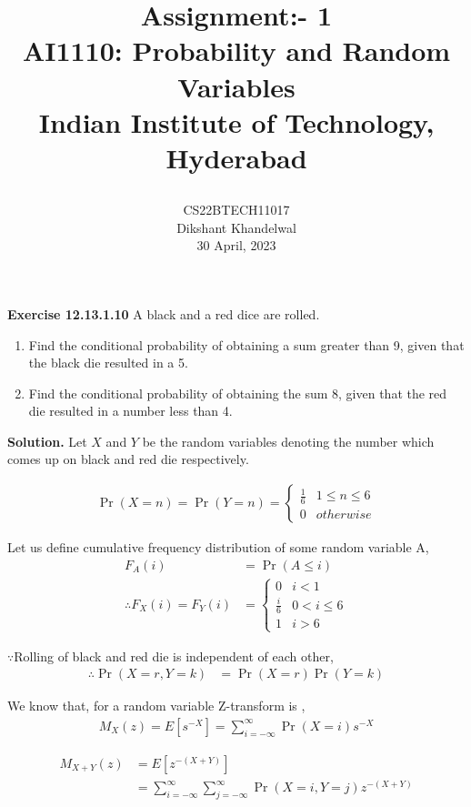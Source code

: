 \documentclass[journal,12pt,twocolumn]{IEEEtran}
\title{

  Assignment:- 1\\
  \Large AI1110: Probability and Random Variables\\
  \Large Indian Institute of Technology, Hyderabad
}
\author{
  CS22BTECH11017\\[4pt]
  Dikshant Khandelwal\\
  30 April, 2023
}
\providecommand{\pr}[1]{\ensuremath{\Pr\left(#1\right)}}
\theoremstyle{remark}
\providecommand{\mean}[1]{E\left[ #1 \right]}
\begin{document}
%

\maketitle

\textbf{Exercise 12.13.1.10} A black and a red dice are rolled.
\begin{enumerate}[label=(\alph*)]
    \item Find the conditional probability of obtaining a sum greater than 9, given
that the black die resulted in a 5.
    \item Find the conditional probability of obtaining the sum 8, given that the red die
resulted in a number less than 4.
\end{enumerate}

\textbf{Solution.} Let $X$ and $Y$ be the random variables denoting the number which comes up on black and red die respectively.

\begin{align}
\label{prdice}
\pr{X= n } = \pr{Y = n} = 
\begin{cases}
\frac{1}{6} & 1 \le n \le 6
\\
0 & otherwise
\end{cases}
\end{align}

Let us define cumulative frequency distribution of some random variable A,
\begin{align}
    F_{A}(i) &= \pr{A \le i}\\
    \therefore  \label{cdf}F_{X}(i) = F_{Y}(i) &= 
              \begin{cases} 0  & i<1\\
                            \frac{i}{6} & 0 < i \le 6\\
                            1 & i> 6
              \end{cases}
\end{align}


$\because$Rolling of black and red die is independent of each other,
\begin{align}
    \therefore \label{eq2}\pr{X=r , Y=k} &= \pr{X=r}\pr{Y= k}
\end{align}

We know that, for a random variable 
 Z-transform is ,
 \begin{align}
     M_{X}(z) = \mean{s^{-X}} = \sum_{i = -\infty}^{\infty}\pr{X = i}s^{-X}
 \end{align}

 \begin{align}
     M_{X+Y}(z) &= \mean{z^{-(X+Y)}}\\
                &= \sum_{i = -\infty}^{\infty}\sum_{j = -\infty}^{\infty} \pr{X = i , Y =j }z^{-(X+Y)}\\
 \end{align}
\end{document}
